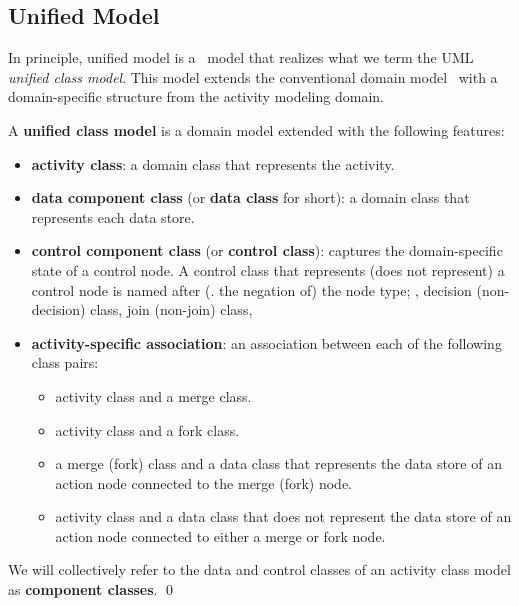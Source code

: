 \subsection{Unified Model}

In principle, unified model is a \dcsl~model that realizes what we term the UML \textit{unified class model}. This model extends the conventional domain model~\cite{evans_domain-driven_2004} with a domain-specific structure from the activity modeling domain.
%
\begin{definition} \label{def:unified-class-model}
	A \textbf{unified class model} is a domain model extended with the following features:
	
	\begin{itemize}%
		\item \textbf{activity class}: a domain class that represents the activity.
		\item \textbf{data component class} (or \textbf{data class} for short): a domain class that represents each data store.
		\item \textbf{control component class} (or \textbf{control class}): captures the domain-specific state of a control node. A control class that represents (\wrt does not represent) a control node is named after (\wrt. the negation of) the node type; \eg, decision (\wrt non-decision) class, join (\wrt non-join) class, \etc
		\item \textbf{activity-specific association}: an association between each of the following class pairs:
		\begin{itemize}
			\item activity class and a merge class.
			\item activity class and a fork class.
			\item a merge (\wrt fork) class and a data class that represents the data store of an action node connected to the merge (\wrt fork) node.
			\item activity class and a data class that does not represent the data store of an action node connected to either a merge or fork node.
		\end{itemize}        	
	\end{itemize}
	We will collectively refer to the data and control classes of an activity class model as \textbf{component classes}. \qed
\end{definition}

